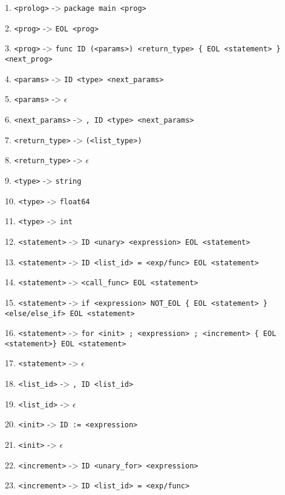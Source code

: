 \documentclass[a4paper, 11pt]{article}
\begin{document}
 \noindent   
 \begin{flushleft}
    1. \texttt{<prolog>} -> \texttt{package main <prog>}

	2. \texttt{<prog>} -> \texttt{EOL <prog>}

	3. \texttt{<prog>} -> \texttt{func ID (<params>) <return\_type> \{ EOL <statement> \} <next\_prog>}

	4. \texttt{<params>} -> \texttt{ID <type> <next\_params>}

	5. \texttt{<params>} -> \texttt{$\epsilon$}

	6. \texttt{<next\_params>} -> \texttt{, ID <type> <next\_params>}

	7. \texttt{<return\_type>} -> \texttt{(<list\_type>)}

	8. \texttt{<return\_type>} -> \texttt{$\epsilon$}

	9. \texttt{<type>} -> \texttt{string}

	10. \texttt{<type>} -> \texttt{float64}

	11. \texttt{<type>} -> \texttt{int}

	12. \texttt{<statement>} -> \texttt{ID <unary> <expression> EOL <statement>}

	13. \texttt{<statement>} -> \texttt{ID <list\_id> = <exp/func> EOL <statement>}

	14. \texttt{<statement>} -> \texttt{<call\_func> EOL <statement>}


	15. \texttt{<statement>} -> \texttt{if <expression> NOT\_EOL \{ EOL <statement> \} <else/else\_if> EOL <statement>}

	16. \texttt{<statement>} -> \texttt{for <init> ; <expression> ; <increment> \{ EOL <statement>\} EOL <statement>}

	17. \texttt{<statement>} -> \texttt{$\epsilon$}

	18. \texttt{<list\_id>} -> \texttt{, ID <list\_id>}

	19. \texttt{<list\_id>} -> \texttt{$\epsilon$}

	20. \texttt{<init>} -> \texttt{ID := <expression>}

	21. \texttt{<init>} -> \texttt{$\epsilon$}

	22. \texttt{<increment>} -> \texttt{ID <unary\_for> <expression>}
	
	23. \texttt{<increment>} -> \texttt{ID <list\_id> = <exp/func>}	


\end{flushleft}
\end{document}
